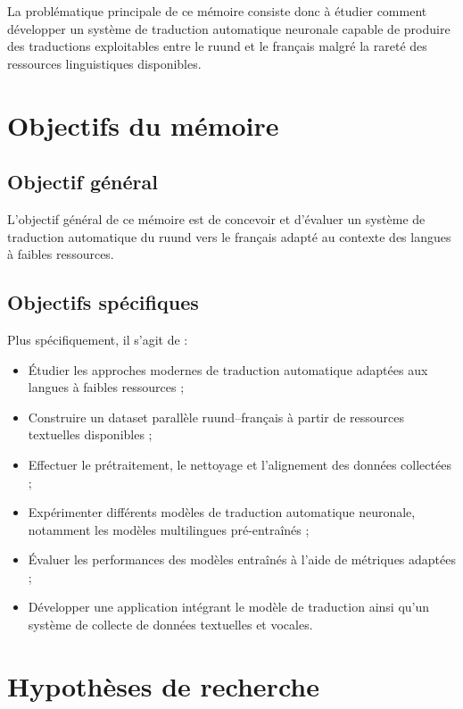 La problématique principale de ce mémoire consiste donc à étudier comment développer un système de traduction automatique neuronale capable de produire des traductions exploitables entre le ruund et le français malgré la rareté des ressources linguistiques disponibles.

\section{Objectifs du mémoire}

\subsection{Objectif général}

L'objectif général de ce mémoire est de concevoir et d'évaluer un système de traduction automatique du ruund vers le français adapté au contexte des langues à faibles ressources.

\subsection{Objectifs spécifiques}

Plus spécifiquement, il s'agit de :

\begin{itemize}
    \item Étudier les approches modernes de traduction automatique adaptées aux langues à faibles ressources ;
    
    \item Construire un dataset parallèle ruund--français à partir de ressources textuelles disponibles ;
    
    \item Effectuer le prétraitement, le nettoyage et l'alignement des données collectées ;
    
    \item Expérimenter différents modèles de traduction automatique neuronale, notamment les modèles multilingues pré-entraînés ;
    
    \item Évaluer les performances des modèles entraînés à l'aide de métriques adaptées ;
    
    \item Développer une application intégrant le modèle de traduction ainsi qu'un système de collecte de données textuelles et vocales.
\end{itemize}

\section{Hypothèses de recherche}

